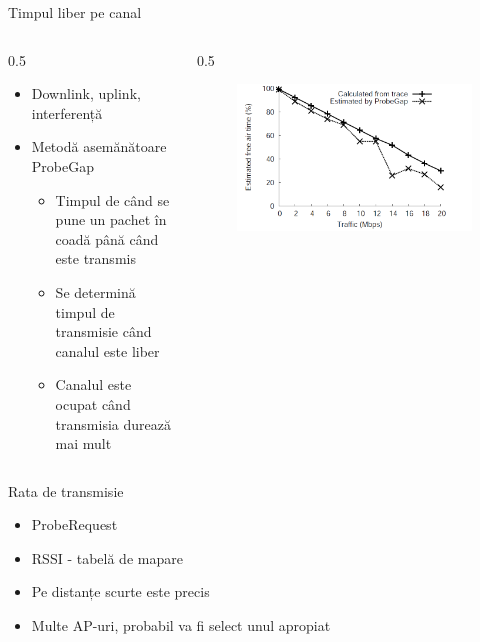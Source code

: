 \begin{frame}{Timpul liber pe canal}
  \begin {columns}
  \begin {column}{0.5\linewidth}
  \begin{itemize}
    \item Downlink, uplink, interferență
    \item Metodă asemănătoare ProbeGap
    \begin{itemize}
      \item Timpul de când se pune un pachet în coadă până când este transmis
      \item Se determină timpul de transmisie când canalul este liber
      \item Canalul este ocupat când transmisia durează mai mult
    \end{itemize}
  \end{itemize}
  \end{column}
  \begin {column}{0.5\linewidth}
      \begin{figure}
        \includegraphics[scale=0.20]{img/fig4.png}
      \end{figure}
  \end{column}
  \end{columns}
\end{frame}
  
\begin{frame}{Rata de transmisie}
  \begin{itemize}
    \item ProbeRequest
    \item RSSI - tabelă de mapare
    \item Pe distanțe scurte este precis
    \item Multe AP-uri, probabil va fi select unul apropiat
  \end{itemize}
\end{frame}
